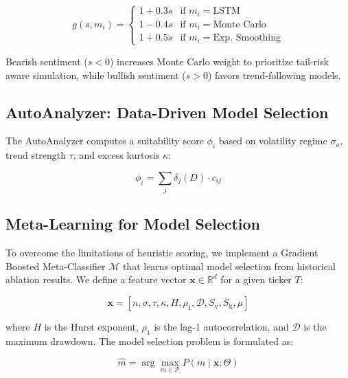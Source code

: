 \documentclass[conference]{IEEEtran}
\begin{document}
\begin{equation}
    g(s, m_i) = \begin{cases}
        1 + 0.3s & \text{if } m_i = \text{LSTM} \\
        1 - 0.4s & \text{if } m_i = \text{Monte Carlo} \\
        1 + 0.5s & \text{if } m_i = \text{Exp. Smoothing}
    \end{cases}
\end{equation}

Bearish sentiment ($s < 0$) increases Monte Carlo weight to prioritize 
tail-risk aware simulation, while bullish sentiment ($s > 0$) favors 
trend-following models.

\subsection{AutoAnalyzer: Data-Driven Model Selection}
\label{sec:autoanalyzer}

The AutoAnalyzer computes a suitability score $\phi_i$ based on 
volatility regime $\sigma_a$, trend strength $\tau$, and excess 
kurtosis $\kappa$:

\begin{equation}
    \phi_i = \sum_{j} \delta_j(D) \cdot c_{ij}
\end{equation}

\subsection{Meta-Learning for Model Selection}
\label{sec:meta_classifier}

To overcome the limitations of heuristic scoring, we implement a Gradient 
Boosted Meta-Classifier $\mathcal{M}$ that learns optimal model selection 
from historical ablation results. We define a feature vector $\mathbf{x} \in 
\mathbb{R}^{d}$ for a given ticker $T$:

\begin{equation}
    \mathbf{x} = [n, \sigma, \tau, \kappa, H, \rho_1, \mathcal{D}, S_{\text{v}}, S_{\text{k}}, \mu]
\end{equation}

where $H$ is the Hurst exponent, $\rho_1$ is the lag-1 autocorrelation, 
and $\mathcal{D}$ is the maximum drawdown. The model selection problem 
is formulated as:

\begin{equation}
    \hat{m} = \arg\max_{m \in \mathcal{P}} P(m \mid \mathbf{x}; \Theta)
\end{equation}
\end{document}
